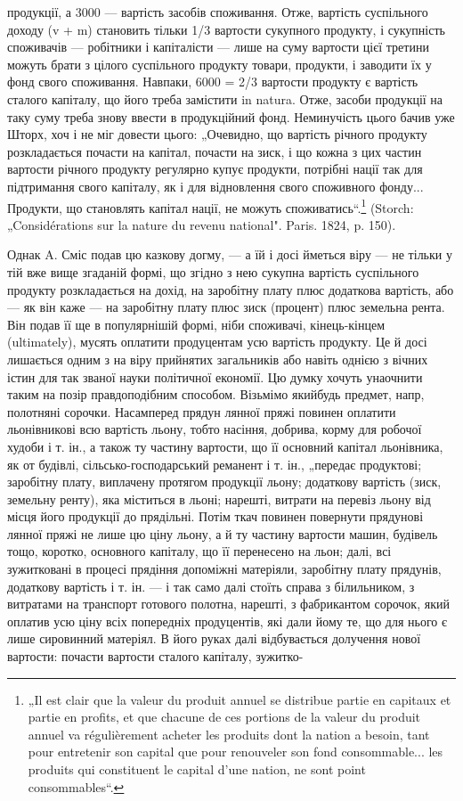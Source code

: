 продукції, а 3000 — вартість засобів споживання. Отже, вартість суспільного
доходу (v + m) становить тільки 1/3 вартости сукупного продукту,
і сукупність споживачів — робітники і капіталісти — лише на суму вартости
цієї третини можуть брати з цілого суспільного продукту товари,
продукти, і заводити їх у фонд свого споживання. Навпаки, 6000 = 2/3
вартости продукту є вартість сталого капіталу, що його треба замістити
in natura. Отже, засоби продукції на таку суму треба знову ввести в
продукційний фонд. Неминучість цього бачив уже Шторх, хоч і не міг
довести цього: „Очевидно, що вартість річного продукту розкладається
почасти на капітал, почасти на зиск, і що кожна з цих частин вартости річного
продукту регулярно купує продукти, потрібні нації так для підтримання
свого капіталу, як і для відновлення свого споживного фонду... Продукти,
що становлять капітал нації, не можуть споживатись“.\footnote*{
„Il est clair que la valeur du produit annuel se distribue partie en capitaux
et partie en profits, et que chacune de ces portions de la valeur du produit annuel
va régulièrement acheter les produits dont la nation a besoin, tant pour entretenir
son capital que pour renouveler son fond consommable... les produits qui constituent
le capital d’une nation, ne sont point consommables“.
} (Storch:
„Considérations sur la nature du revenu national". Paris. 1824, p. 150).

Однак A. Сміс подав цю казкову догму, — а їй і досі йметься
віру — не тільки у тій вже вище згаданій формі, що згідно з нею сукупна
вартість суспільного продукту розкладається на дохід, на заробітну
плату плюс додаткова вартість, або — як він каже — на заробітну плату
плюс зиск (процент) плюс земельна рента. Він подав її ще в популярнішій
формі, ніби споживачі, кінець-кінцем (ultimately), мусять оплатити
продуцентам усю вартість продукту. Це й досі лишається
одним з на віру прийнятих загальників або навіть однією з вічних істин
для так званої науки політичної економії. Цю думку хочуть унаочнити таким
на позір правдоподібним способом. Візьмімо якийбудь предмет, напр,
полотняні сорочки. Насамперед прядун лянної пряжі повинен оплатити
льонівникові всю вартість льону, тобто насіння, добрива, корму для робочої
худоби і т. ін., а також ту частину вартости, що її основний
капітал льонівника, як от будівлі, сільсько-господарський реманент і т. ін.,
„передає продуктові; заробітну плату, виплачену протягом продукції
льону; додаткову вартість (зиск, земельну ренту), яка міститься в льоні;
нарешті, витрати на перевіз льону від місця його продукції до прядільні.
Потім ткач повинен повернути прядунові лянної пряжі не лише цю
ціну льону, а й ту частину вартости машин, будівель тощо, коротко,
основного капіталу, що її перенесено на льон; далі, всі зужитковані
в процесі прядіння допоміжні матеріяли, заробітну плату прядунів, додаткову
вартість і т. ін. — і так само далі стоїть справа з білильником, з витратами
на транспорт готового полотна, нарешті, з фабрикантом сорочок,
який оплатив усю ціну всіх попередніх продуцентів, які дали йому те,
що для нього є лише сировинний матеріял. В його руках далі відбувається
долучення нової вартости: почасти вартости сталого капіталу, зужитко-